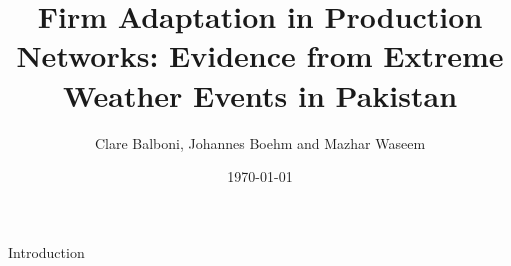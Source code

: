 \documentclass{beamer}
\begin{document}
\title{Firm Adaptation in Production Networks: Evidence from Extreme Weather Events in Pakistan}
\author{Clare Balboni, Johannes Boehm and Mazhar Waseem}

\date{\today}

\frame{\titlepage}


\begin{frame}{Introduction}


\end{frame}
\end{document}
